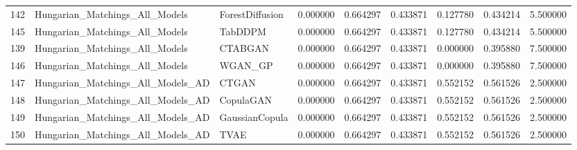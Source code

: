 \begin{tabular}{lllrrrrrr}
142 & Hungarian_Matchings_All_Models & ForestDiffusion & 0.000000 & 0.664297 & 0.433871 & 0.127780 & 0.434214 & 5.500000 \\
145 & Hungarian_Matchings_All_Models & TabDDPM & 0.000000 & 0.664297 & 0.433871 & 0.127780 & 0.434214 & 5.500000 \\
139 & Hungarian_Matchings_All_Models & CTABGAN & 0.000000 & 0.664297 & 0.433871 & 0.000000 & 0.395880 & 7.500000 \\
146 & Hungarian_Matchings_All_Models & WGAN_GP & 0.000000 & 0.664297 & 0.433871 & 0.000000 & 0.395880 & 7.500000 \\
147 & Hungarian_Matchings_All_Models_AD & CTGAN & 0.000000 & 0.664297 & 0.433871 & 0.552152 & 0.561526 & 2.500000 \\
148 & Hungarian_Matchings_All_Models_AD & CopulaGAN & 0.000000 & 0.664297 & 0.433871 & 0.552152 & 0.561526 & 2.500000 \\
149 & Hungarian_Matchings_All_Models_AD & GaussianCopula & 0.000000 & 0.664297 & 0.433871 & 0.552152 & 0.561526 & 2.500000 \\
150 & Hungarian_Matchings_All_Models_AD & TVAE & 0.000000 & 0.664297 & 0.433871 & 0.552152 & 0.561526 & 2.500000 \\
\bottomrule
\end{tabular}
